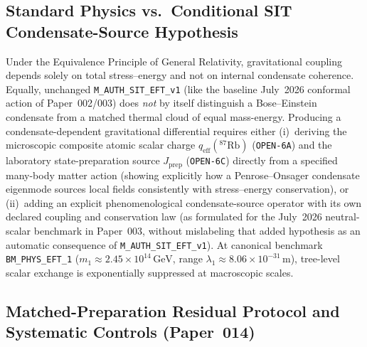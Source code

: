 \subsection{Standard Physics vs.\ Conditional SIT Condensate-Source Hypothesis}

Under the Equivalence Principle of General Relativity, gravitational coupling depends solely on total stress--energy and not on internal condensate coherence. Equally, unchanged \texttt{M\_AUTH\_SIT\_EFT\_v1} (like the baseline July~2026 conformal action of Paper~002/003) does \emph{not} by itself distinguish a Bose--Einstein condensate from a matched thermal cloud of equal mass-energy. Producing a condensate-dependent gravitational differential requires either (i)~deriving the microscopic composite atomic scalar charge $q_{\mathrm{eff}}(^{87}\mathrm{Rb})$ (\texttt{OPEN-6A}) and the laboratory state-preparation source $J_{\mathrm{prep}}$ (\texttt{OPEN-6C}) directly from a specified many-body matter action (showing explicitly how a Penrose--Onsager condensate eigenmode sources local fields consistently with stress--energy conservation), or (ii)~adding an explicit phenomenological condensate-source operator with its own declared coupling and conservation law (as formulated for the July~2026 neutral-scalar benchmark in Paper~003, without mislabeling that added hypothesis as an automatic consequence of \texttt{M\_AUTH\_SIT\_EFT\_v1}). At canonical benchmark \texttt{BM\_PHYS\_EFT\_1} ($m_1 \approx 2.45\times 10^{14}\,\mathrm{GeV}$, range $\lambda_1 \approx 8.06\times 10^{-31}\,\mathrm{m}$), tree-level scalar exchange is exponentially suppressed at macroscopic scales.

\subsection{Matched-Preparation Residual Protocol and Systematic Controls (Paper~014)}


